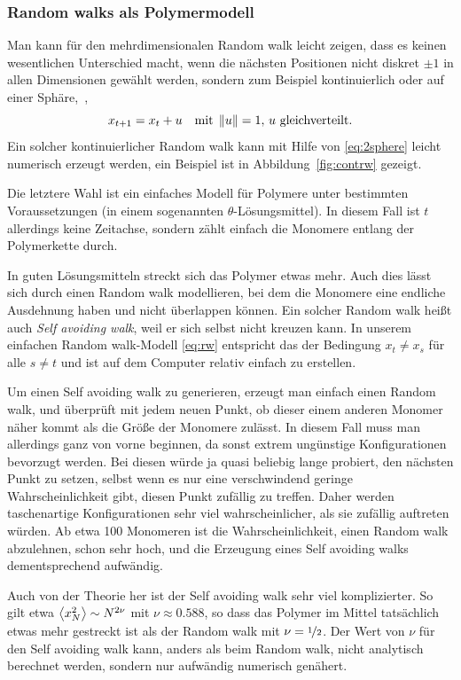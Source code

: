 \subsubsection{Random walks als Polymermodell}

Man kann für den mehrdimensionalen Random walk leicht zeigen, dass es
keinen wesentlichen Unterschied macht, wenn die nächsten Positionen
nicht diskret $\pm 1$ in allen Dimensionen gewählt werden, sondern zum
Beispiel kontinuierlich oder auf einer Sphäre, \dh\,,
\begin{equation}
  x_{t+1} = x_t + u \quad\text{mit}\; \left\lVert{u}\right\rVert=1,\,u\text{ gleichverteilt}.
\end{equation}
Ein solcher kontinuierlicher Random walk kann mit Hilfe von
\eqref{eq:2sphere} leicht numerisch erzeugt werden, ein Beispiel ist
in Abbildung~\ref{fig:contrw} gezeigt.

Die letztere Wahl ist ein einfaches Modell für Polymere unter
bestimmten Voraussetzungen (in einem sogenannten
$\theta$-Lösungsmittel).  In diesem Fall ist $t$ allerdings keine
Zeitachse, sondern zählt einfach die Monomere entlang der Polymerkette
durch.

In guten Lösungsmitteln streckt sich das Polymer etwas mehr. Auch dies
lässt sich durch einen Random walk modellieren, bei dem die Monomere
eine endliche Ausdehnung haben und nicht überlappen können. Ein
solcher Random walk heißt auch \emph{Self avoiding walk}, weil er sich
selbst nicht kreuzen kann. In unserem einfachen Random walk-Modell
\eqref{eq:rw} entspricht das der Bedingung $x_t\neq x_s$ für alle
$s\neq t$ und ist auf dem Computer relativ einfach zu erstellen.

Um einen Self avoiding walk zu generieren, erzeugt man einfach einen
Random walk, und überprüft mit jedem neuen Punkt, ob dieser einem
anderen Monomer näher kommt als die Größe der Monomere zulässt. In
diesem Fall muss man allerdings ganz von vorne beginnen, da sonst
extrem ungünstige Konfigurationen bevorzugt werden. Bei diesen würde
ja quasi beliebig lange probiert, den nächsten Punkt zu setzen, selbst
wenn es nur eine verschwindend geringe Wahrscheinlichkeit gibt, diesen
Punkt zufällig zu treffen. Daher werden taschenartige Konfigurationen
sehr viel wahrscheinlicher, als sie zufällig auftreten würden. Ab etwa
100 Monomeren ist die Wahrscheinlichkeit, einen Random walk
abzulehnen, schon sehr hoch, und die Erzeugung eines Self avoiding
walks dementsprechend aufwändig.

Auch von der Theorie her ist der Self avoiding walk sehr viel
komplizierter. So gilt etwa $\left\langle{x_N^2}\right\rangle \sim N^{2\nu}$ mit
$\nu\approx 0.588$, so dass das Polymer im Mittel tatsächlich etwas
mehr gestreckt ist als der Random walk mit $\nu=\nicefrac{1}{2}$. Der
Wert von $\nu$ für den Self avoiding walk kann, anders als beim Random
walk, nicht analytisch berechnet werden, sondern nur aufwändig
numerisch genähert.

